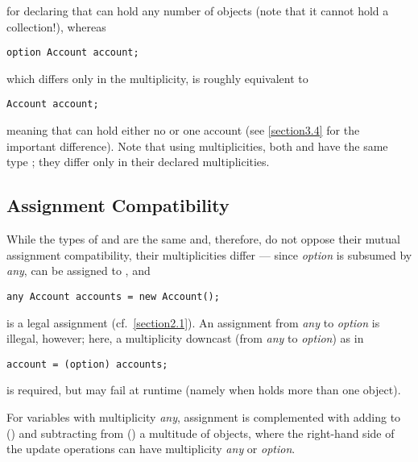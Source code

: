 {\noindent for declaring that  can hold any number of
 objects (note that it cannot hold a collection!), whereas

\begin{lstlisting}
option Account account;
\end{lstlisting}

\noindent which differs only in the multiplicity, is roughly equivalent to

\begin{lstlisting}
Account account;
\end{lstlisting}

\noindent meaning that  can hold either no or one account
(see \autoref{section3.4} for the important difference).  Note that using
multiplicities, both  and  have the same type
; they differ only in their declared multiplicities.

\subsection{Assignment Compatibility}
\label{section3.3}

\noindent While the types of  and  are the same
and, therefore, do not oppose their mutual assignment compatibility, their
multiplicities differ --- since \emph{option} is subsumed
by \emph{any},  can be assigned to , and

\begin{lstlisting}
any Account accounts = new Account();
\end{lstlisting}

\noindent is a legal assignment (cf.~\autoref{section2.1}). An assignment from
\emph{any} to \emph{option} is illegal, however; here, a
multiplicity downcast (from \emph{any} to \emph{option}) as in

\begin{lstlisting}
account = (option) accounts;
\end{lstlisting}

\noindent is required, but may fail at runtime (namely when 
holds more than one object).

For variables with multiplicity \emph{any}, assignment is
complemented with adding to (\inline{+=}) and subtracting from (\inline{-=})
a multitude of objects, where the right-hand side of the update operations
can have multiplicity \emph{any} or \emph{option}.

}
